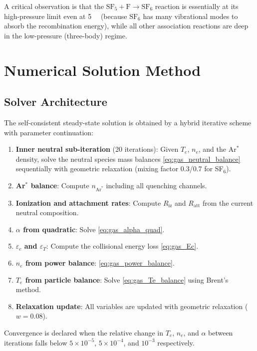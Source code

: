 \documentclass[11pt,a4paper]{report}
\newcommand{\SFsix}{\mathrm{SF}_6}
\newcommand{\SFfive}{\mathrm{SF}_5}
\newcommand{\Ar}{\mathrm{Ar}}
\newcommand{\Te}{T_e}
\begin{document}
A critical observation is that the $\SFfive + \mathrm{F} \to \SFsix$ reaction is essentially at its high-pressure limit even at \SI{5}{\milli\torr} (because $\SFsix$ has many vibrational modes to absorb the recombination energy), while all other association reactions are deep in the low-pressure (three-body) regime.

\section{Numerical Solution Method}
\label{sec:gasphase_numerics}

\subsection{Solver Architecture}
\label{sec:gasphase_solver}

The self-consistent steady-state solution is obtained by a hybrid iterative scheme with parameter continuation:

\begin{enumerate}
\item \textbf{Inner neutral sub-iteration} (20 iterations): Given $\Te$, $n_e$, and the Ar$^*$ density, solve the neutral species mass balances \eqref{eq:gas_neutral_balance} sequentially with geometric relaxation (mixing factor 0.3/0.7 for SF$_6$).
\item \textbf{Ar$^*$ balance}: Compute $n_{\Ar^*}$ including all quenching channels.
\item \textbf{Ionization and attachment rates}: Compute $R_\mathrm{iz}$ and $R_\mathrm{att}$ from the current neutral composition.
\item \textbf{$\alpha$ from quadratic}: Solve \eqref{eq:gas_alpha_quad}.
\item \textbf{$\varepsilon_c$ and $\varepsilon_T$}: Compute the collisional energy loss \eqref{eq:gas_Ec}.
\item \textbf{$n_e$ from power balance}: \eqref{eq:gas_power_balance}.
\item \textbf{$\Te$ from particle balance}: Solve \eqref{eq:gas_Te_balance} using Brent's method.
\item \textbf{Relaxation update}: All variables are updated with geometric relaxation ($w = 0.08$).
\end{enumerate}

Convergence is declared when the relative change in $\Te$, $n_e$, and $\alpha$ between iterations falls below $5 \times 10^{-5}$, $5 \times 10^{-4}$, and $10^{-3}$ respectively.
\end{document}
